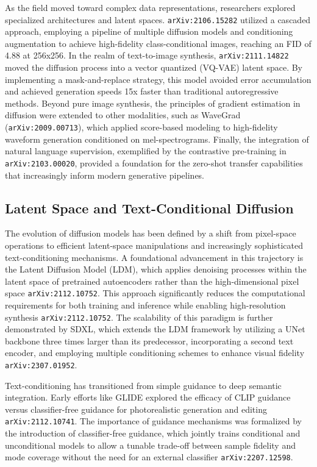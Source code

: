 \documentclass[11pt]{article}
\begin{document}
As the field moved toward complex data representations, researchers explored specialized architectures and latent spaces. \texttt{arXiv:2106.15282} utilized a cascaded approach, employing a pipeline of multiple diffusion models and conditioning augmentation to achieve high-fidelity class-conditional images, reaching an FID of 4.88 at 256x256. In the realm of text-to-image synthesis, \texttt{arXiv:2111.14822} moved the diffusion process into a vector quantized (VQ-VAE) latent space. By implementing a mask-and-replace strategy, this model avoided error accumulation and achieved generation speeds 15x faster than traditional autoregressive methods. Beyond pure image synthesis, the principles of gradient estimation in diffusion were extended to other modalities, such as WaveGrad (\texttt{arXiv:2009.00713}), which applied score-based modeling to high-fidelity waveform generation conditioned on mel-spectrograms. Finally, the integration of natural language supervision, exemplified by the contrastive pre-training in \texttt{arXiv:2103.00020}, provided a foundation for the zero-shot transfer capabilities that increasingly inform modern generative pipelines.

\subsection{Latent Space and Text-Conditional Diffusion}

The evolution of diffusion models has been defined by a shift from pixel-space operations to efficient latent-space manipulations and increasingly sophisticated text-conditioning mechanisms. A foundational advancement in this trajectory is the Latent Diffusion Model (LDM), which applies denoising processes within the latent space of pretrained autoencoders rather than the high-dimensional pixel space \texttt{arXiv:2112.10752}. This approach significantly reduces the computational requirements for both training and inference while enabling high-resolution synthesis \texttt{arXiv:2112.10752}. The scalability of this paradigm is further demonstrated by SDXL, which extends the LDM framework by utilizing a UNet backbone three times larger than its predecessor, incorporating a second text encoder, and employing multiple conditioning schemes to enhance visual fidelity \texttt{arXiv:2307.01952}.

Text-conditioning has transitioned from simple guidance to deep semantic integration. Early efforts like GLIDE explored the efficacy of CLIP guidance versus classifier-free guidance for photorealistic generation and editing \texttt{arXiv:2112.10741}. The importance of guidance mechanisms was formalized by the introduction of classifier-free guidance, which jointly trains conditional and unconditional models to allow a tunable trade-off between sample fidelity and mode coverage without the need for an external classifier \texttt{arXiv:2207.12598}.
\end{document}
